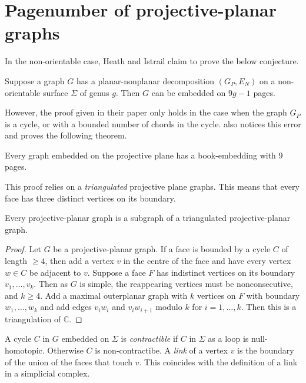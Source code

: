 
\section{Pagenumber of projective-planar graphs}
In the non-orientable case, Heath and Istrail claim to prove the below conjecture.
\begin{conjecture}\label{lem:planar_nonplanar_nonorientable}
	Suppose a graph \(G\) has a planar-nonplanar decomposition \((G_P, E_N)\) on a non-orientable surface \(\Sigma\) of genus $g$. Then \(G\) can be embedded on \(9g - 1\) pages.
\end{conjecture}
However, the proof given in their paper only holds in the case when the graph $G_P$ is a cycle, or with a bounded number of chords in the cycle. \textcite{nakamotoBookEmbeddingProjectiveplanar2015} also notices this error and proves the following theorem.

\begin{theorem}\label{thm:proj_planar_graphs_9pages}
	Every graph embedded on the projective plane has a book-embedding with $9$ pages.
\end{theorem}

This proof relies on a \textit{triangulated} projective plane graphs. This means that every face has three distinct vertices on its boundary. 

\begin{theorem}
    Every projective-planar graph is a subgraph of a triangulated projective-planar graph.
\end{theorem}

\begin{proof}
    Let $G$ be a projective-planar graph. If a face is bounded by a cycle $C$ of length $\geq 4$, then add a vertex $v$ in the centre of the face and have every vertex $w \in C$ be adjacent to $v$. Suppose a face $F$ has indistinct vertices on its boundary $v_1, \ldots, v_k$. Then as $G$ is simple, the reappearing vertices must be nonconsecutive, and $k \geq 4$. Add a maximal outerplanar graph with $k$ vertices on $F$ with boundary $w_1, \ldots, w_k$ and add edges $v_i w_i$ and $v_i w_{i + 1}$ modulo $k$ for $i = 1, \ldots, k$. Then this is a triangulation of $\mathbb{C}$. 
\end{proof}

A cycle $C$ in $G$ embedded on $\Sigma$ is \textit{contractible} if $C$ in $\Sigma$ as a loop is null-homotopic. Otherwise $C$ is non-contractibe. 
A \textit{link} of a vertex $v$ is the boundary of the union of the faces that touch $v$. This coincides with the definition of a link in a simplicial complex.

